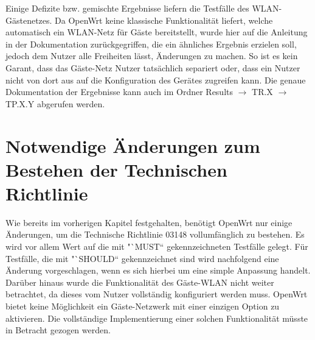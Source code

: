 \documentclass[a4paper]{book}
\begin{document}
\begin{large}
\begin{onehalfspace}
 
\indent Einige Defizite bzw. gemischte Ergebnisse liefern die Testfälle des WLAN-Gästenetzes. Da OpenWrt keine klassische Funktionalität liefert, welche automatisch ein WLAN-Netz für Gäste bereitstellt, wurde hier auf die Anleitung in der Dokumentation zurückgegriffen, die ein ähnliches Ergebnis erzielen soll, jedoch dem Nutzer alle Freiheiten lässt, Änderungen zu machen. So ist es kein Garant, dass das Gäste-Netz Nutzer tatsächlich separiert oder, dass ein Nutzer nicht von dort aus auf die Konfiguration des Gerätes zugreifen kann. Die genaue Dokumentation der Ergebnisse kann auch im Ordner \glqq Results\grqq{} $\rightarrow$ TR.X $\rightarrow$ TP.X.Y abgerufen werden. 


\end{onehalfspace}

\section{Notwendige Änderungen zum Bestehen der Technischen Richtlinie}
\label{anderungen}
\begin{onehalfspace}
Wie bereits im vorherigen Kapitel festgehalten, benötigt OpenWrt nur einige Änderungen, um die Technische Richtlinie 03148 vollumfänglich zu bestehen. Es wird vor allem Wert auf die mit "`MUST“ gekennzeichneten Testfälle gelegt. Für Testfälle, die mit "`SHOULD“ gekennzeichnet sind wird nachfolgend eine Änderung vorgeschlagen, wenn es sich hierbei um eine simple Anpassung handelt. Darüber hinaus wurde die Funktionalität des Gäste-WLAN nicht weiter betrachtet, da dieses vom Nutzer vollständig konfiguriert werden muss. OpenWrt bietet keine Möglichkeit ein Gäste-Netzwerk mit einer einzigen Option zu aktivieren. Die vollständige Implementierung einer solchen Funktionalität müsste in Betracht gezogen werden.	\\ \indent

\end{onehalfspace}
\end{large}
\end{document}
